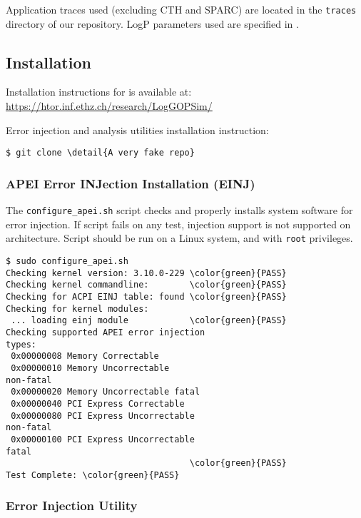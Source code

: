 Application traces used (excluding CTH and SPARC) are located in the {\texttt{traces}} 
directory of our repository.  LogP parameters used are specified in .

\subsection{Installation}

Installation instructions for \LogGOPSim is available at: \url{https://htor.inf.ethz.ch/research/LogGOPSim/}

Error injection and analysis utilities installation instruction:


\begin{Verbatim}[commandchars=\\\{\},frame=single]
 $ git clone \detail{A very fake repo}
\end{Verbatim}

\subsubsection{APEI Error INJection Installation (EINJ)}

The {\texttt{configure\_apei.sh}} script checks and properly installs system
software for error injection.  If script fails on any test, injection support is
not supported on architecture.  Script should be run on a Linux system, and with
{\texttt{root}} privileges.

\begin{Verbatim}[commandchars=\\\{\},frame=single]
 $ sudo configure_apei.sh
Checking kernel version: 3.10.0-229 \color{green}{PASS}
Checking kernel commandline:        \color{green}{PASS}
Checking for ACPI EINJ table: found \color{green}{PASS}
Checking for kernel modules:
 ... loading einj module            \color{green}{PASS}
Checking supported APEI error injection
types:
 0x00000008 Memory Correctable
 0x00000010 Memory Uncorrectable
non-fatal
 0x00000020 Memory Uncorrectable fatal
 0x00000040 PCI Express Correctable
 0x00000080 PCI Express Uncorrectable
non-fatal
 0x00000100 PCI Express Uncorrectable
fatal
                                    \color{green}{PASS}
Test Complete: \color{green}{PASS}
\end{Verbatim}


\subsubsection{Error Injection Utility}

